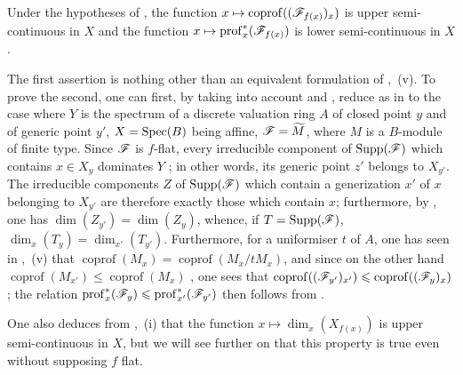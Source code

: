\begin{corollary}[12.1.3]
\label{IV.12.1.3}
Under the hypotheses of , the function $x\mapsto\operatorname{coprof}((\mathscr{F}_{f(x)})_x)$ is upper semi-continuous in $X$ and the function $x\mapsto\operatorname{prof}_x^*(\mathscr{F}_{f(x)})$  is lower semi-continuous in $X$.
\end{corollary}

The first assertion is nothing other than an equivalent formulation of ,~(v).
To prove the second, one can first, by taking into account  and , reduce as in  to the case where $Y$ is the spectrum of a discrete valuation ring $A$ of closed point $y$ and of generic point $y'$, $X=\operatorname{Spec}(B)$ being affine, $\mathscr{F}=\widetilde{M}$, where $M$ is a $B$-module of finite type.
Since $\mathscr{F}$ is $f$-flat, every irreducible component of $\operatorname{Supp}(\mathscr{F})$ which contains $x\in X_y$ dominates $Y$ ; in other words, its generic point $z'$ belongs to $X_{y'}$. The irreducible components $Z$ of $\operatorname{Supp}(\mathscr{F})$ which contain a generization $x'$ of $x$ belonging to $X_{y'}$ are therefore exactly those which contain $x$; furthermore, by , one has $\dim(Z_{y'})=\dim(Z_y)$, whence, if $T=\operatorname{Supp}(\mathscr{F})$, $\dim_x(T_y)=\dim_{x'}(T_{y'})$.
Furthermore, for a uniformiser $t$ of $A$, one has seen in ,~(v) that $\operatorname{coprof}(M_x)=\operatorname{coprof}(M_x/tM_x)$, and since on the other hand $\operatorname{coprof}(M_{x'})\leqslant\operatorname{coprof}(M_x)$ , one sees that $\operatorname{coprof}((\mathscr{F}_{y'})_{x'})\leqslant\operatorname{coprof}((\mathscr{F}_y)_x)$; the relation $\operatorname{prof}_x^*(\mathscr{F}_y)\leqslant\operatorname{prof}_{x'}^*(\mathscr{F}_{y'})$ then follows from .

\begin{remark}[12.1.4]
\label{IV.12.1.4}
One also deduces from ,~(i) that the function $x\mapsto\dim_x(X_{f(x)})$ is upper semi-continuous in $X$, but we will see further on  that this property is true even without supposing $f$ flat.
\end{remark}

